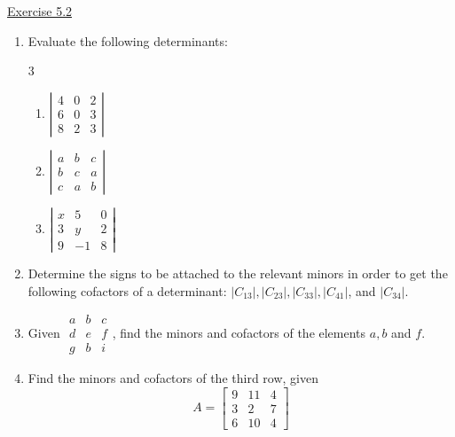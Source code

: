 \underline{Exercise 5.2}

\begin{enumerate}

\item Evaluate the following determinants: 
\begin{multicols}{3}
\begin{enumerate}
\item [(c)] $\left|\begin{array}{lll}4 & 0 & 2 \\ 6 & 0 & 3 \\ 8 & 2 & 3\end{array}\right|$
\item [(e)] $\left|\begin{array}{lll}a & b & c \\ b & c & a \\ c & a & b\end{array}\right|$
\item [(f)] $\left|\begin{array}{rrr}x & 5 & 0 \\ 3 & y & 2 \\ 9 & -1 & 8\end{array}\right|$
\end{enumerate}
\end{multicols}

\item[2.] Determine the signs to be attached to the relevant minors in order to get the following cofactors of a determinant: $|C_{13}|,|C_{23}|, |C_{33}|,|C_{41}|$, and $|C_{34}|$.

\item[3.] Given $ \begin{array}{|lll|}a & b & c \\ d & e & f \\ g & b & i\end{array}$, find the minors and cofactors of the elements $a, b$ and $f$.

\item[6.] Find the minors and cofactors of the third row, given
\[
A=\left[\begin{array}{rrr}
9 & 11 & 4 \\
3 & 2 & 7 \\
6 & 10 & 4
\end{array}\right]
\]

\end{enumerate}


